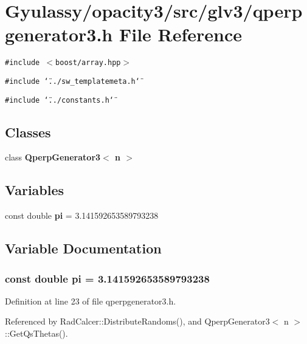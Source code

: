 \section{Gyulassy/opacity3/src/glv3/qperpgenerator3.h File Reference}
\label{qperpgenerator3_8h}
{\tt \#include $<$boost/array.hpp$>$}\par
{\tt \#include \char`\"{}../sw\_\-templatemeta.h\char`\"{}}\par
{\tt \#include \char`\"{}../constants.h\char`\"{}}\par
\subsection*{Classes}
\begin{CompactItemize}
\item 
class {\bf QperpGenerator3$<$ n $>$}
\end{CompactItemize}
\subsection*{Variables}
\begin{CompactItemize}
\item 
const double {\bf pi} = 3.141592653589793238
\end{CompactItemize}


\subsection{Variable Documentation}
\subsubsection{\setlength{\rightskip}{0pt plus 5cm}const double {\bf pi} = 3.141592653589793238\hspace{0.3cm}{\tt  [static]}}\label{qperpgenerator3_8h_43016d873124d39034edb8cd164794db}




Definition at line 23 of file qperpgenerator3.h.

Referenced by RadCalcer::DistributeRandoms(), and QperpGenerator3$<$ n $>$::GetQsThetas().